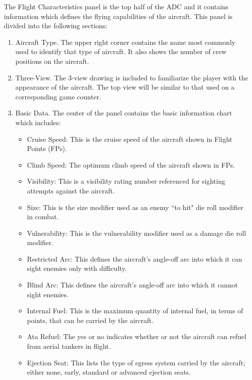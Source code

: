 The Flight Characteristics panel is the top half of the ADC and it contains information which defines the flying capabilities of the aircraft. This panel is divided into the following sections:

\begin{enumerate}

    \item Aircraft Type. The upper right corner contains the name most commonly used to identify that type of aircraft. It also shows the number of crew positions on the aircraft.

    \item Three-View. The 3-view drawing is included to familiarize the player with the appearance of the aircraft. The top view will be similar to that used on a corresponding game counter.

    \item Basic Data. The center of the panel contains the basic information chart which includes:
    \begin{itemize}
        \item Cruise Speed: This is the cruise speed of the aircraft shown in Flight Points (FPs).
        \item Climb Speed: The optimum climb speed of the aircraft shown in FPs.
        \item Visibility: This is a visibility rating number referenced for sighting attempts against the aircraft.
        \item Size: This is the size modifier used as an enemy “to hit" die roll modifier in combat.
        \item Vulnerability: This is the vulnerability modifier used as a damage die roll modifier.
        \item Restricted Arc: This defines the aircraft's angle-off arc into which it can sight enemies only with difficulty.
        \item Blind Arc: This defines the aircraft's angle-off arc into which it cannot sight enemies.
        \item Internal Fuel: This is the maximum quantity of internal fuel, in terms of points, that can be carried by the aircraft.
        \item Ata Refuel: The yes or no indicates whether or not the aircraft can refuel from aerial tankers in flight.
        \item Ejection Seat: This lists the type of egress system carried by the aircraft; either none, early, standard or advanced ejection seats.
    \end{itemize}


\end{enumerate}
